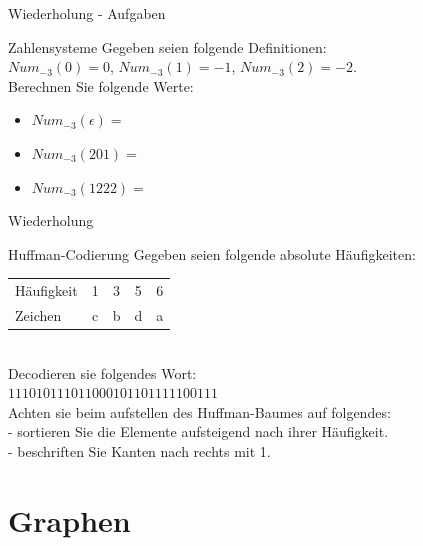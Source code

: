 	
	
	\begin{frame} {Wiederholung - Aufgaben}
		\begin{block}{Zahlensysteme}
			Gegeben seien folgende Definitionen: \\
			$Num_{-3}(0)=0$, $Num_{-3}(1)=-1$, $Num_{-3}(2)=-2$.\\
			Berechnen Sie folgende Werte:\\
			\begin{itemize}
				\item $Num_{-3}(\epsilon) = $\visible<2->{$\;0$}\\
				\item $Num_{-3}(201) = $\visible<3->{$\;-19$}\\
				\item $Num_{-3}(1222) = $\visible<4->{$\;13$}
			\end{itemize}			 
		\end{block}
	\end{frame}
	
	
	
	\begin{frame} {Wiederholung}
		\begin{block}{Huffman-Codierung}
			Gegeben seien folgende absolute Häufigkeiten:\\
			\vspace{5pt}
			\begin{tabular}{l||cccc}
				Häufigkeit 	& 1 & 3 & 5 & 6\\
				Zeichen		& c & b & d & a\\
			\end{tabular}\\
			\vspace{5pt}
			Decodieren sie folgendes Wort:\\
			\vspace{10pt}
			$111010111011000101101111100111$\\
			 \vspace{20pt}
			Achten sie beim aufstellen des Huffman-Baumes auf folgendes:\\
			 - sortieren Sie die Elemente aufsteigend nach ihrer Häufigkeit.\\
			 - beschriften Sie Kanten nach rechts mit 1.
			
		\end{block}
	\end{frame}
	
	
	\section{Graphen}
